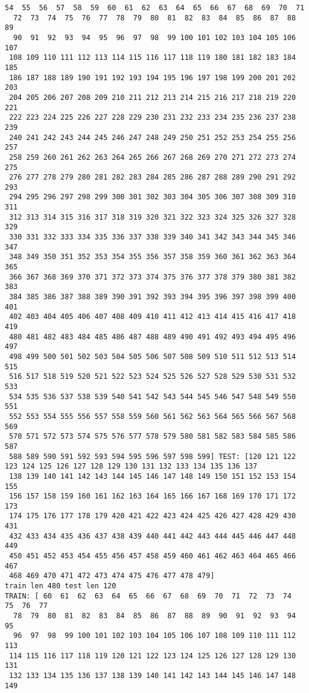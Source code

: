 \documentclass[11pt]{article}
\begin{document}
\begin{Verbatim}[commandchars=\\\{\}]
  54  55  56  57  58  59  60  61  62  63  64  65  66  67  68  69  70  71
  72  73  74  75  76  77  78  79  80  81  82  83  84  85  86  87  88  89
  90  91  92  93  94  95  96  97  98  99 100 101 102 103 104 105 106 107
 108 109 110 111 112 113 114 115 116 117 118 119 180 181 182 183 184 185
 186 187 188 189 190 191 192 193 194 195 196 197 198 199 200 201 202 203
 204 205 206 207 208 209 210 211 212 213 214 215 216 217 218 219 220 221
 222 223 224 225 226 227 228 229 230 231 232 233 234 235 236 237 238 239
 240 241 242 243 244 245 246 247 248 249 250 251 252 253 254 255 256 257
 258 259 260 261 262 263 264 265 266 267 268 269 270 271 272 273 274 275
 276 277 278 279 280 281 282 283 284 285 286 287 288 289 290 291 292 293
 294 295 296 297 298 299 300 301 302 303 304 305 306 307 308 309 310 311
 312 313 314 315 316 317 318 319 320 321 322 323 324 325 326 327 328 329
 330 331 332 333 334 335 336 337 338 339 340 341 342 343 344 345 346 347
 348 349 350 351 352 353 354 355 356 357 358 359 360 361 362 363 364 365
 366 367 368 369 370 371 372 373 374 375 376 377 378 379 380 381 382 383
 384 385 386 387 388 389 390 391 392 393 394 395 396 397 398 399 400 401
 402 403 404 405 406 407 408 409 410 411 412 413 414 415 416 417 418 419
 480 481 482 483 484 485 486 487 488 489 490 491 492 493 494 495 496 497
 498 499 500 501 502 503 504 505 506 507 508 509 510 511 512 513 514 515
 516 517 518 519 520 521 522 523 524 525 526 527 528 529 530 531 532 533
 534 535 536 537 538 539 540 541 542 543 544 545 546 547 548 549 550 551
 552 553 554 555 556 557 558 559 560 561 562 563 564 565 566 567 568 569
 570 571 572 573 574 575 576 577 578 579 580 581 582 583 584 585 586 587
 588 589 590 591 592 593 594 595 596 597 598 599] TEST: [120 121 122 123 124 125 126 127 128 129 130 131 132 133 134 135 136 137
 138 139 140 141 142 143 144 145 146 147 148 149 150 151 152 153 154 155
 156 157 158 159 160 161 162 163 164 165 166 167 168 169 170 171 172 173
 174 175 176 177 178 179 420 421 422 423 424 425 426 427 428 429 430 431
 432 433 434 435 436 437 438 439 440 441 442 443 444 445 446 447 448 449
 450 451 452 453 454 455 456 457 458 459 460 461 462 463 464 465 466 467
 468 469 470 471 472 473 474 475 476 477 478 479]
train len 480 test len 120
TRAIN: [ 60  61  62  63  64  65  66  67  68  69  70  71  72  73  74  75  76  77
  78  79  80  81  82  83  84  85  86  87  88  89  90  91  92  93  94  95
  96  97  98  99 100 101 102 103 104 105 106 107 108 109 110 111 112 113
 114 115 116 117 118 119 120 121 122 123 124 125 126 127 128 129 130 131
 132 133 134 135 136 137 138 139 140 141 142 143 144 145 146 147 148 149

\end{Verbatim}
\end{document}
